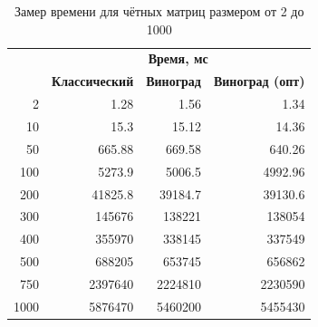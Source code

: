 \begin{table}[ht]
	\small
	\begin{center}
		\begin{threeparttable}
			\caption{Замер времени для чётных матриц размером от 2 до 1000}
			\label{tbl:time_even}
			\begin{tabular}{|r|r|r|r|}
				\hline
				& \multicolumn{3}{c|}{\bfseries Время, мс} \\
				\cline{2-4}
				\bfseries \makecell{Линейный размер} & \bfseries Классический & \bfseries Виноград & \bfseries Виноград (опт) \\
				\cline{2-4}
				\hline
				2 & 1.28 & 1.56 & 1.34 \\ 
				\hline 
				10 & 15.3 & 15.12 & 14.36 \\ 
				\hline 
				50 & 665.88 & 669.58 & 640.26 \\ 
				\hline 
				100 & 5273.9 & 5006.5 & 4992.96 \\ 
				\hline 
				200 & 41825.8 & 39184.7 & 39130.6 \\ 
				\hline 
				300 & 145676 & 138221 & 138054 \\ 
				\hline 
				400 & 355970 & 338145 & 337549 \\ 
				\hline 
				500 & 688205 & 653745 & 656862 \\ 
				\hline 
				750 & 2397640 & 2224810 & 2230590 \\ 
				\hline 
				1000 & 5876470 & 5460200 & 5455430 \\ 
				\hline
			\end{tabular}	
		\end{threeparttable}
	\end{center}
\end{table}

